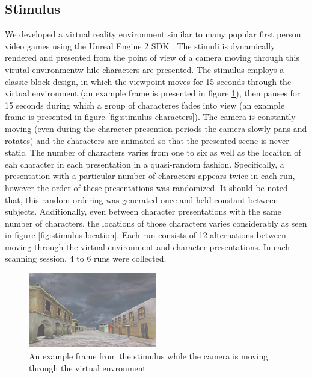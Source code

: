\documentclass[twocolumn,final]{article}
\begin{document}
\subsection{Stimulus}
We developed a virtual reality environment similar to many popular first person video games using the Unreal Engine 2 SDK \cite{UnrealEngine2}.
The stimuli is dynamically rendered and presented from the point of view of a camera moving through this virutal environmentw hile characters are presented.
The stimulus employs a classic block design, in which the viewpoint moves for 15 seconds through the virtual environment (an example frame is presented in figure \ref{fig:stimulus-movement}), then pauses for 15 seconds during which a group of characteres fades into view (an example frame is presented in figure \ref{fig:stimulus-characters}).
The camera is constantly moving (even during the character presention periods the camera slowly pans and rotates) and the characters are animated so that the presented scene is never static.
The number of characters varies from one to six as well as the locaiton of eah character in each presentation in a quasi-random fashion.
Specifically, a presentation with a particular number of characters appears twice in each run, however the order of these presentations was randomized.
It should be noted that, this random ordering was generated once and held constant between subjects.
Additionally, even between character presentations with the same number of characters, the locations of those characters varies considerably as seen in figure \ref{fig:stimulus-location}.
Each run consists of 12 alternations between moving through the virtual environment and character presentations. 
In each scanning session, 4 to 6 runs were collected.

\begin{figure}[!htbp]
\centering
\includegraphics[width=0.5\textwidth]{figures/stimulus-movement}
\caption{An example frame from the stimulus while the camera is moving through the virtual envronment.}
\label{fig:stimulus-movement}
\end{figure}
\end{document}
